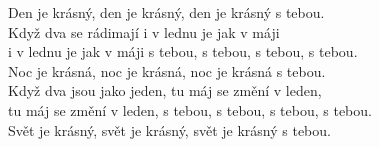 
Den je krásný, den je krásný, den je krásný s tebou.\\

Když dva se rádimají i v lednu je jak v máji\\
 i v lednu je jak v máji s tebou, s tebou, s tebou, s tebou.\\

Noc je krásná, noc je krásná, noc je krásná s tebou.\\
Když dva jsou jako jeden, tu máj se změní v leden,\\
tu máj se změní v leden, s tebou, s tebou, s tebou, s tebou.\\

Svět je krásný, svět je krásný, svět je krásný s tebou.

\newpage

